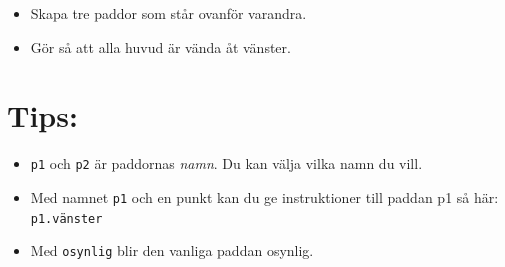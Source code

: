 \begin{itemize}

\item {Skapa tre paddor som står ovanför varandra.}
\item {Gör så att alla huvud är vända åt vänster.}

\end{itemize}


\section*{\color{OliveGreen}Tips:}


\begin{itemize}

\item {\lstinline{p1} och \lstinline{p2} är paddornas {\it namn}. Du kan välja vilka namn du vill.}
\item {Med namnet \lstinline{p1} och en punkt kan du ge instruktioner till paddan p1 så här: \lstinline{p1.vänster}}
\item {Med \lstinline{osynlig} blir den vanliga paddan osynlig.}

\end{itemize}


